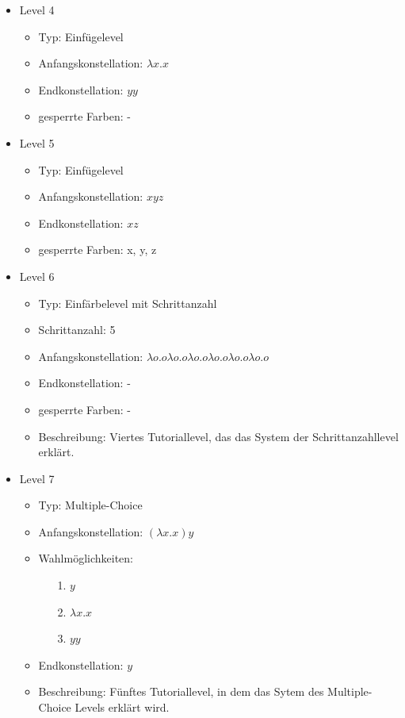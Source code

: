 \begin{itemize}
	\item{Level 4} 
		\begin{itemize}
			\item{Typ:} Einfügelevel
			\item{Anfangskonstellation:} \(\lambda x . x \)    
			\item{Endkonstellation:} \(y y\)
			\item{gesperrte Farben:} - 
		\end{itemize}

	\item{Level 5} 
		\begin{itemize}
			\item{Typ:} Einfügelevel
			\item{Anfangskonstellation:} \(x y z\)    
			\item{Endkonstellation:}  \(x z\)
			\item{gesperrte Farben:} x, y, z
		\end{itemize}

	\item{Level 6} 
		\begin{itemize}
			\item{Typ:} Einfärbelevel mit Schrittanzahl
			\item{Schrittanzahl:} 5
			\item{Anfangskonstellation:} \(\lambda o . o   \lambda o . o  \lambda o . o   \lambda o . o  \lambda o . o   \lambda o . o \) 
			\item{Endkonstellation:}  -
			\item{gesperrte Farben:} -
			\item{Beschreibung:} Viertes Tutoriallevel, das das System der Schrittanzahllevel erklärt.
		\end{itemize}

	\item{Level 7} 
		\begin{itemize}
			\item{Typ:} Multiple-Choice 
			\item{Anfangskonstellation:} \((\lambda x . x ) y\)    
			\item{Wahlmöglichkeiten:}  
				\begin{itemize}
					\item[1.] \(y\)
					\item[2.] \(\lambda x . x \) 
					\item[3.] \(y y\)
				\end{itemize}
			\item{Endkonstellation:} \(y\)
			\item{Beschreibung:} Fünftes Tutoriallevel, in dem das Sytem des Multiple-Choice Levels erklärt wird.
		\end{itemize}


\end{itemize}
